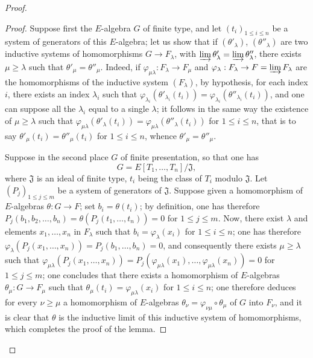 \begin{proof}
\begin{proof}
Suppose first the $E$-algebra $G$ of finite type, and let $(t_i)_{1\leqslant i\leqslant n}$ be a system of generators of this $E$-algebra; let us show that if $(\theta'_\lambda)$, $(\theta''_\lambda)$ are two inductive systems of homomorphisms $G\to F_\lambda$, with $\varinjlim\theta'_\lambda=\varinjlim\theta''_\lambda$, there exists $\mu\geqslant\lambda$ such that $\theta'_\mu=\theta''_\mu$.
Indeed, if $\varphi_{\mu\lambda}:F_\lambda\to F_\mu$ and $\varphi_\lambda:F_\lambda\to F=\varinjlim F_\lambda$ are the homomorphisms of the inductive system $(F_\lambda)$, by hypothesis, for each index $i$, there exists an index $\lambda_i$ such that $\varphi_{\lambda_i}(\theta'_{\lambda_i}(t_i))=\varphi_{\lambda_i}(\theta''_{\lambda_i}(t_i))$, and one can suppose all the $\lambda_i$ equal to a single $\lambda$; it follows in the same way the existence of $\mu\geqslant\lambda$ such that $\varphi_{\mu\lambda}(\theta'_\lambda(t_i))=\varphi_{\mu\lambda}(\theta''_\lambda(t_i))$ for $1\leqslant i\leqslant n$, that is to say $\theta'_\mu(t_i)=\theta''_\mu(t_i)$ for $1\leqslant i\leqslant n$, whence $\theta'_\mu=\theta''_\mu$.

Suppose in the second place $G$ of finite presentation, so that one has
\[
  G=E[T_1,\ldots,T_n]/\mathfrak{J},
\]
where $\mathfrak{J}$ is an ideal of finite type, $t_i$ being the class of $T_i$ modulo $\mathfrak{J}$.
Let $(P_j)_{1\leqslant j\leqslant m}$ be a system of generators of $\mathfrak{J}$.
Suppose given a homomorphism of $E$-algebras $\theta:G\to F$; set $b_i=\theta(t_i)$; by definition, one has therefore $P_j(b_1,b_2,\ldots,b_n)=\theta(P_j(t_1,\ldots,t_n))=0$ for $1\leqslant j\leqslant m$.
Now, there exist $\lambda$ and elements $x_1,\ldots,x_n$ in $F_\lambda$ such that $b_i=\varphi_\lambda(x_i)$ for $1\leqslant i\leqslant n$; one has therefore $\varphi_\lambda(P_j(x_1,\ldots,x_n))=P_j(b_1,\ldots,b_n)=0$, and consequently there exists $\mu\geqslant\lambda$ such that $\varphi_{\mu\lambda}(P_j(x_1,\ldots,x_n))=P_j(\varphi_{\mu\lambda}(x_1),\ldots,\varphi_{\mu\lambda}(x_n))=0$ for $1\leqslant j\leqslant m$; one concludes that there exists a homomorphism of $E$-algebras $\theta_\mu:G\to F_\mu$ such that $\theta_\mu(t_i)=\varphi_{\mu\lambda}(x_i)$
for $1\leqslant i\leqslant n$; one therefore deduces for every $\nu\geqslant\mu$ a homomorphism of $E$-algebras $\theta_\nu=\varphi_{\nu\mu}\circ\theta_\mu$ of $G$ into $F_\nu$, and it is clear that $\theta$ is the inductive limit of this inductive system of homomorphisms, which completes the proof of the lemma.
\end{proof}


\end{proof}
